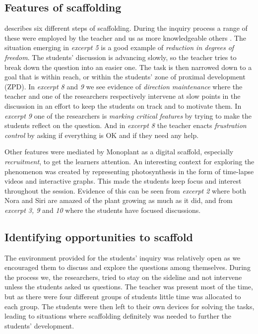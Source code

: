 \subsection{Features of scaffolding}
\citet{wood1976role} describes six different steps of scaffolding. During the inquiry process a range of these were employed by the teacher and us as more knowledgeable others \citep{vygotskiui1978mind}. The situation emerging in \emph{excerpt 5} is a good example of \emph{reduction in degrees of freedom}. The students' discussion is advancing slowly, so the teacher tries to break down the question into an easier one. The task is then narrowed down to a goal that is within reach, or within the students' zone of proximal development (ZPD). In \emph{excerpt 8} and \emph{9} we see evidence of \emph{direction maintenance} where the teacher and one of the researchers respectively intervene at slow points in the discussion in an effort to keep the students on track and to motivate them. In \emph{excerpt 9} one of the researchers is \emph{marking critical features} by trying to make the students reflect on the question. And in \emph{excerpt 8} the teacher enacts \emph{frustration control} by asking if everything is OK and if they need any help. 

Other features were mediated by Monoplant as a digital scaffold, especially \emph{recruitment}, to get the learners attention. An interesting context for exploring the phenomenon was created by representing photosynthesis in the form of time-lapse videos and interactive graphs. This made the students keep focus and interest throughout the session. Evidence of this can be seen from \emph{excerpt 2} where both Nora and Siri are amazed of the plant growing as much as it did, and from \emph{excerpt 3, 9} and \emph{10} where the students have focused discussions. 


\subsection{Identifying opportunities to scaffold}
The environment provided for the students' inquiry was relatively open as we encouraged them to discuss and explore the questions among themselves. During the process we, the researchers, tried to stay on the sideline and not intervene unless the students asked us questions. The teacher was present most of the time, but as there were four different groups of students little time was allocated to each group. The students were then left to their own devices for solving the tasks, leading to situations where scaffolding definitely was needed to further the students' development. 

